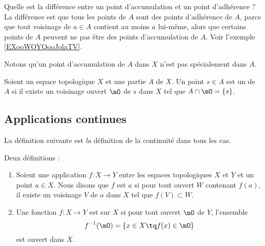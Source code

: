Quelle est la différence entre un point d'accumulation et un point d'adhérence ? La différence est que tous les points de \( A\) sont des points d'adhérence de \( A\), parce que tout voisinage de \( a\in A\) contient au moins \( a\) lui-même, alors que certains points de \( A\) peuvent ne pas être des points d'accumulation de \( A\). Voir l'exemple \ref{EXooWOYQooJolaTV}.

Notons qu'un point d'accumulation de \( A\) dans \( X\) n'est pas spécialement dans \( A\).

\begin{definition}      \label{DEFooXIOWooWUKJhN}
	Soient un espace topologique \( X\) et une partie \( A\) de \( X\). Un point \( s\in A \) est un  de \( A\) si il existe un voisinage ouvert \( \mO\) de \( s\) dans \( X\) tel que \( A\cap\mO=\{ s \}\).
\end{definition}

\subsection{Applications continues}

La définition suivante est \emph{la} définition de la continuité dans tous les cas.
\begin{definition}\label{DefOLNtrxB}
	Deux définitions :
	\begin{enumerate}
		\item   \label{ITEMooXARPooNzsWLr}
		      Soient une application \( f\colon X\to Y\) entre les espaces topologiques \( X\) et \( Y\) et un point \( a\in X\). Nous disons que \( f\) est  \( a\) si pour tout ouvert \( W\) contenant \( f(a)\), il existe un voisinage \( V\) de \( a\) dans \( X\) tel que \( f(V)\subset W\).
		\item       \label{ITEMooEHGWooDdITRV}
		      Une fonction \( f\colon X\to Y\) est  sur \( X\) si pour tout ouvert \( \mO\) de \( Y\), l'ensemble
		      \begin{equation}      \label{defFminus1ofaset}
			      f^{-1}(\mO) = \{ x \in X \tq f(x) \in \mO\}
		      \end{equation}
		      est ouvert dans \( X\).
	\end{enumerate}
\end{definition}

